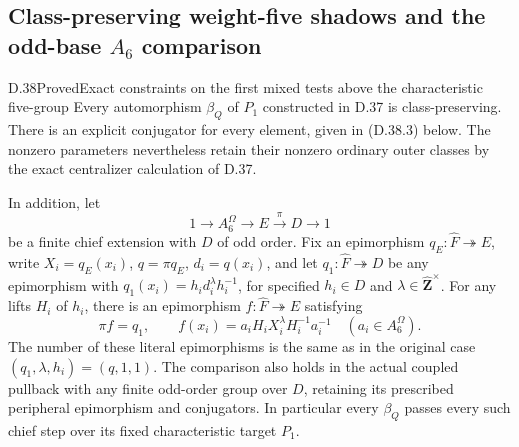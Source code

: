 \subsection{Class-preserving weight-five shadows and the odd-base \texorpdfstring{$A_6$}{A6} comparison}

\begin{statement}{D.38}{Proved}{Exact constraints on the first mixed tests above the characteristic five-group}
Every automorphism \(\beta_Q\) of \(P_1\) constructed in D.37 is
class-preserving.  There is an explicit conjugator for every element,
given in \textup{(D.38.3)} below.  The nonzero parameters nevertheless
retain their nonzero ordinary outer classes by the exact centralizer
calculation of D.37.

In addition, let
\[
 1\longrightarrow A_6^\Omega\longrightarrow E
       \xrightarrow{\pi}D\longrightarrow1
 \tag{D.38.1}
\]
be a finite chief extension with \(D\) of odd order.  Fix an
epimorphism \(q_E:\widehat F\twoheadrightarrow E\), write
\(X_i=q_E(x_i)\), \(q=\pi q_E\), \(d_i=q(x_i)\), and let
\(q_1:\widehat F\twoheadrightarrow D\) be any epimorphism with
\(q_1(x_i)=h_i d_i^\lambda h_i^{-1}\), for specified \(h_i\in D\)
and \(\lambda\in\widehat{\mathbf Z}^{\times}\).
For any lifts \(H_i\) of \(h_i\), there is an epimorphism
\(f:\widehat F\twoheadrightarrow E\) satisfying
\[
 \pi f=q_1,\qquad
 f(x_i)=a_iH_iX_i^\lambda H_i^{-1}a_i^{-1}
                  \quad(a_i\in A_6^\Omega).
 \tag{D.38.2}
\]
The number of these literal epimorphisms is the same as in the
original case \((q_1,\lambda,h_i)=(q,1,1)\).
The comparison also holds in the actual coupled pullback with
any finite odd-order group over \(D\), retaining its prescribed
peripheral epimorphism and conjugators.
In particular every \(\beta_Q\) passes every such chief step
over its fixed characteristic target \(P_1\).
\end{statement}

